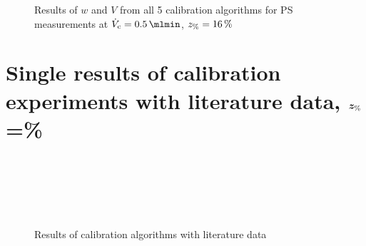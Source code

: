 \begin{figure}[!hb]
\begin{center}
\begin{subfigure}{\subFigSize}
    \end{subfigure}
  \end{center}
  \vspace*{-4ex}    
  \caption[Results of $w$ and $V$ from all 5 calibration algorithms for PS measurements at
  $\Vc = \SI{0.5}{\mlmin}$, $\zP = \SI{16}{\percent}$]{
    Results of $w$ and $V$ from all 5 calibration algorithms for PS measurements at
    $\Vc = \SI{0.5}{\mlmin}$, $\zP = \SI{16}{\percent}$
  }
  \label{fig:calibRes_PS_VC0_5_16}
\end{figure}
\FloatBarrier
\section*{Single results of calibration experiments with literature data, 
  $\bm{z_\text{\%}}$\thinspace=\thinspace\%}
\begin{figure}[H]
  \begin{center}
    \begin{subfigure}{.75\linewidth}
    \end{subfigure}\\
    \begin{subfigure}{.75\linewidth}
    \end{subfigure}\\
    \begin{subfigure}{.75\linewidth}
    \end{subfigure}\\
    \begin{subfigure}{.75\linewidth}
    \end{subfigure}
  \end{center}
  \caption[Results of calibration algorithms with literature data
  ]{Results of calibration algorithms with literature data}
  \label{fig:LitDataResults_p8}
\end{figure}
\clearpage

